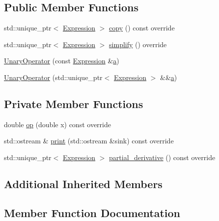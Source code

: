 \subsection*{Public Member Functions}
\begin{DoxyCompactItemize}
\item 
std\+::unique\+\_\+ptr$<$ \mbox{\hyperlink{classsymcpp_1_1Expression}{Expression}} $>$ \mbox{\hyperlink{classsymcpp_1_1Logarithm_ac7315464088f7ef34cfce74e518b939a}{copy}} () const override
\item 
std\+::unique\+\_\+ptr$<$ \mbox{\hyperlink{classsymcpp_1_1Expression}{Expression}} $>$ \mbox{\hyperlink{classsymcpp_1_1Logarithm_af771894e90cbe561e3eb2e9a9b32954b}{simplify}} () override
\item 
\mbox{\hyperlink{classsymcpp_1_1Logarithm_a23a8172db96675ebf1114f4f3f41b6f1}{Unary\+Operator}} (const \mbox{\hyperlink{classsymcpp_1_1Expression}{Expression}} \&\mbox{\hyperlink{classsymcpp_1_1UnaryOperator_a1558842963261562d2ef68e324822cba}{a}})
\item 
\mbox{\hyperlink{classsymcpp_1_1Logarithm_ad3aa899567a080eeb41cb850de310178}{Unary\+Operator}} (std\+::unique\+\_\+ptr$<$ \mbox{\hyperlink{classsymcpp_1_1Expression}{Expression}} $>$ \&\&\mbox{\hyperlink{classsymcpp_1_1UnaryOperator_a1558842963261562d2ef68e324822cba}{a}})
\end{DoxyCompactItemize}
\subsection*{Private Member Functions}
\begin{DoxyCompactItemize}
\item 
double \mbox{\hyperlink{classsymcpp_1_1Logarithm_a349cbd26700ea28d18a42f6f8d7e722c}{op}} (double x) const override
\item 
std\+::ostream \& \mbox{\hyperlink{classsymcpp_1_1Logarithm_a336bed1a474b338eabd6a258d527b65b}{print}} (std\+::ostream \&sink) const override
\item 
std\+::unique\+\_\+ptr$<$ \mbox{\hyperlink{classsymcpp_1_1Expression}{Expression}} $>$ \mbox{\hyperlink{classsymcpp_1_1Logarithm_ab5cb1daed6613731d15ee13d17c48f7b}{partial\+\_\+derivative}} () const override
\end{DoxyCompactItemize}
\subsection*{Additional Inherited Members}


\subsection{Member Function Documentation}
\mbox{\label{classsymcpp_1_1Logarithm_ac7315464088f7ef34cfce74e518b939a}} 
